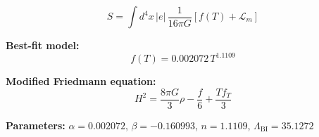 
\begin{equation}
  S = \int d^4x \, |e| \, \frac{1}{16\pi G} \left[ f(T) + \mathcal{L}_m \right]
\end{equation}

\textbf{Best-fit model:}
\begin{equation}
  f(T) = 0.002072 \, T^{1.1109}
\end{equation}

\textbf{Modified Friedmann equation:}
\begin{equation}
  H^2 = \frac{8\pi G}{3} \rho - \frac{f}{6} + \frac{T f_T}{3}
\end{equation}

\textbf{Parameters:}
$\alpha = 0.002072$, \quad
$\beta = -0.160993$, \quad
$n = 1.1109$, \quad
$\Lambda_{\text{BI}} = 35.1272$